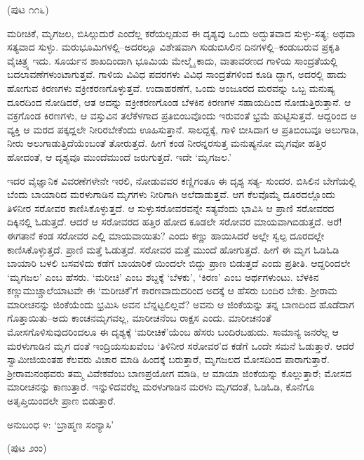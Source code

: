 \begin{center}
(ಪುಟ ೧೧೬)
\end{center}

ಮರೀಚಿಕೆ, ಮೃಗಜಲ, ಬಿಸಿಲ್ಗುದುರೆ ಎಂದೆಲ್ಲ ಕರೆಯಲ್ಪಡುವ ಈ ದೃಶ್ಯವು ಒಂದು ಅದ್ಭುತವಾದ ಸುಳ್ಳು-ಸತ್ಯ; ಅಥವಾ ಸತ್ಯವಾದ ಸುಳ್ಳು. ಮರುಭೂಮಿಗಳಲ್ಲಿ–ಅದರಲ್ಲೂ ವಿಶೇಷವಾಗಿ ಸುಡುಬಿಸಿಲಿನ ದಿನಗಳಲ್ಲಿ–ಕಂಡುಬರುವ ಪ್ರಕೃತಿ ವೈಚಿತ್ರ್ಯ ಇದು. ಸೂರ್ಯನ ಶಾಖದಿಂದಾಗಿ ಭೂಮಿಯ ಮೇಲ್ಮೈ ಕಾದು, ವಾತಾವರಣದ ಗಾಳಿಯ ಸಾಂದ್ರತೆಯಲ್ಲಿ ಬದಲಾವಣೆಗಳುಂಟಾಗುತ್ತವೆ. ಗಾಳಿಯ ವಿವಿಧ ಪದರಗಳು ವಿವಿಧ ಸಾಂದ್ರತೆಗಳಿಂದ ಕೂಡಿ ದ್ದಾಗ, ಅದರಲ್ಲಿ ಹಾದು ಹೋಗುವ ಕಿರಣಗಳು ವಕ್ರೀಕರಣಗೊಳ್ಳುತ್ತವೆ. ಉದಾಹರಣೆಗೆ, ಒಂದು ಅಂಜೂರದ ಮರವನ್ನು ಒಬ್ಬ ಮನುಷ್ಯ ದೂರದಿಂದ ನೋಡಿದರೆ, ಆತ ಅದನ್ನು ವಕ್ರೀಕರಣಗೊಂಡ ಬೆಳಕಿನ ಕಿರಣಗಳ ಸಹಾಯದಿಂದ ನೋಡುತ್ತಿರುತ್ತಾನೆ. ಆ ವಕ್ರಗೊಂಡ ಕಿರಣಗಳು, ಆ ವಸ್ತುವಿನ ತಲೆಕೆಳಗಾದ ಪ್ರತಿಬಿಂಬವೊಂದು ಇರುವಂತೆ ಭ್ರಮೆ ಹುಟ್ಟಿಸುತ್ತವೆ. ಆದ್ದರಿಂದ ಆ ವ್ಯಕ್ತಿ ಆ ಮರದ ಪಕ್ಕದ್ಲಲೇ ನೀರಿರಬೇಕೆಂದು ಊಹಿಸುತ್ತಾನೆ. ಸಾಲದ್ದಕ್ಕೆ, ಗಾಳಿ ಬೀಸಿದಾಗ ಆ ಪ್ರತಿಬಿಂಬವೂ ಅಲುಗಾಡಿ, ನೀರು ಅಲುಗಾಡುತ್ತಿದೆಯೆಂಬಂತೆ ತೋರುತ್ತದೆ. ಹೀಗೆ ಕಂಡ ನೀರನ್ನರಸುತ್ತ ಮನುಷ್ಯನೋ ಮೃಗವೋ ಹತ್ತಿರ ಹೋದಂತೆ, ಆ ದೃಶ್ಯವೂ ಮುಂದೆಮುಂದೆ ಜರುಗುತ್ತದೆ. ಇದೇ ‘ಮೃಗಜಲ.’

ಇದರ ವೈಜ್ಞಾನಿಕ ವಿವರಣೆಗಳೇನೇ ಇರಲಿ, ನೋಡುವವರ ಕಣ್ಣಿಗಂತೂ ಈ ದೃಶ್ಯ ಸತ್ಯ- ಸುಂದರ. ಬಿಸಿಲಿನ ಬೇಗೆಯಲ್ಲಿ ಬೆಂದು ಬಾಯಾರಿದ ಮರಳುಗಾಡಿನ ಮೃಗಗಳು ನೀರಿಗಾಗಿ ಅಲೆದಾಡುತ್ತವೆ. ಆಗ ಕೆಲವೊಮ್ಮೆ ದೂರದಲ್ಲೊಂದು ತಿಳಿನೀರ ಸರೋವರ ಕಾಣಿಸಿಕೊಳ್ಳುತ್ತದೆ. ಆ ಸುಳ್ಳುಸರೋವರವನ್ನೇ ಸತ್ಯವೆಂದು ಭಾವಿಸಿ ಆ ಪ್ರಾಣಿ ಸರೋವರದ ದಿಕ್ಕಿನಲ್ಲಿ ಓಡುತ್ತದೆ. ಆದರೆ ಆ ಸರೋವರದ ಹತ್ತಿರ ಹೋದ ಕೂಡಲೇ ಸರೋವರ ಮಾಯವಾಗಿಬಿಡುತ್ತದೆ. ಅರೆ! ಈಗತಾನೆ ಕಂಡ ಸರೋವರ ಎಲ್ಲಿ ಮಾಯವಾಯಿತು? ಎಂದು ಕಣ್ಣು ಹಾಯಿಸಿದರೆ ಅಲ್ಲೇ ಸ್ವಲ್ಪ ದೂರದಲ್ಲೇ ಕಾಣಿಸಿಕೊಳ್ಳುತ್ತದೆ. ಪ್ರಾಣಿ ಮತ್ತೆ ಓಡುತ್ತದೆ. ಸರೋವರ ಮತ್ತೆ ಮುಂದೆ ಹೋಗುತ್ತದೆ. ಹೀಗೆ ಈ ಮೃಗ ಓಡಿಓಡಿ ಬಾಯಾರಿ ಬಳಲಿ ಬಸವಳಿದು ಕಡೆಗೆ ಬಾಯಾರಿಕೆ ಯಿಂದಲೇ ಬಿದ್ದು ಪ್ರಾಣ ಬಿಡುತ್ತದೆ ಎಂದು ಪ್ರತೀತಿ. ಆದ್ದರಿಂದಲೇ ‘ಮೃಗಜಲ’ ಎಂಬ ಹೆಸರು. ‘ಮರೀಚಿ’ ಎಂಬ ಶಬ್ದಕ್ಕೆ ‘ಬೆಳಕು’, ‘ಕಿರಣ’ ಎಂಬ ಅರ್ಥಗಳುಂಟು. ಬೆಳಕಿನ ಕಣ್ಣುಮುಚ್ಚಾಲೆಯಾಟವೇ ಈ ‘ಮರೀಚಿಕೆ’ಗೆ ಕಾರಣವಾದುದರಿಂದ ಅದಕ್ಕೆ ಆ ಹೆಸರು ಬಂದಿರ ಬೇಕು. ಶ್ರೀರಾಮ ಮಾರೀಚನನ್ನು ಜಿಂಕೆಯೆಂದು ಭ್ರಮಿಸಿ ಅವನ ಬೆನ್ನಟ್ಟಲಿಲ್ಲವೆ? ಅವನು ಆ ಜಿಂಕೆಯನ್ನು ತನ್ನ ಬಾಣದಿಂದ ಹೊಡೆದಾಗ ಗೊತ್ತಾಯಿತು–ಅದು ಕಾಂಚನಮೃಗವಲ್ಲ, ಮಾರೀಚನೆಂಬ ರಾಕ್ಷಸ ಎಂದು. ಮಾರೀಚನಂತೆ ಮೋಸಗೊಳಿಸುವುದರಿಂದಲೂ ಈ ದೃಶ್ಯಕ್ಕೆ ‘ಮರೀಚಿಕೆ’ಯೆಂಬ ಹೆಸರು ಬಂದಿರಬಹುದು. ಸಾಮಾನ್ಯ ಜನರೆಲ್ಲ ಆ ಮರಳುಗಾಡಿನ ಮೃಗ ದಂತೆ ಇಂದ್ರಿಯಸುಖವೆಂಬ ‘ತಿಳಿನೀರ ಸರೋವರ’ದ ಕಡೆಗೆ ಒಂದೇ ಸಮನೆ ಓಡುತ್ತಾರೆ. ಆದರೆ ಸ್ವಾಮೀಜಿಯಂತಹ ಕೆಲವರು ವಿಚಾರ ಮಾಡಿ ಹಿಂದಕ್ಕೆ ಬರುತ್ತಾರೆ, ಮೃಗಜಲದ ಮೋಸದಿಂದ ಪಾರಾಗುತ್ತಾರೆ. ಶ್ರೀರಾಮನಂಥವರು ತಮ್ಮ ವಿವೇಕವೆಂಬ ಬಾಣಪ್ರಯೋಗ ಮಾಡಿ, ಆ ಮಾಯಾ ಜಿಂಕೆಯನ್ನು ಕೊಲ್ಲುತ್ತಾರೆ; ಮೋಸದ ಮಾರೀಚನನ್ನು ಕಾಣುತ್ತಾರೆ. ಇನ್ನುಳಿದವರೆಲ್ಲ ಮರಳುಗಾಡಿನ ಮರಳು ಮೃಗದಂತೆ, ಓಡಿಓಡಿ, ಕೊನೆಗೂ ಅತೃಪ್ತಿಯಿಂದಲೇ ಪ್ರಾಣ ಬಿಡುತ್ತಾರೆ.


\begin{center}
ಅನುಬಂಧ ೪: ‘ಬ್ರಾಹ್ಮಣ ಸಂನ್ಯಾಸಿ’
\end{center}

\begin{center}
(ಪುಟ ೨ಂಂ)
\end{center}


